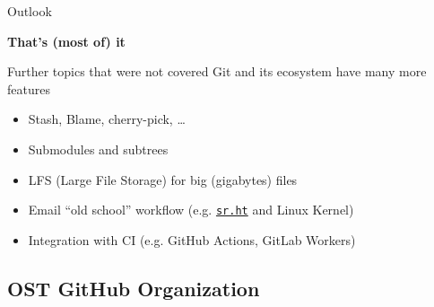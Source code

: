 \documentclass[xetex]{beamer}
\begin{document}
\begin{frame}{Outlook}

  \centering
  {
    \Huge\bfseries
    That's (most of) it
  }
  \vspace{1cm}

  \begin{block}{Further topics that were not covered}
    Git and its ecosystem have many more features
    \begin{itemize}
      \item Stash, Blame, cherry-pick, \ldots
      \item Submodules and subtrees
      \item LFS (Large File Storage) for big (gigabytes) files 
      \item Email ``old school'' workflow (e.g. \href{https://sr.ht}{\texttt{sr.ht}} and Linux Kernel)
      \item Integration with CI (e.g. GitHub Actions, GitLab Workers)
    \end{itemize}
  \end{block}
\end{frame}

\subsection{OST GitHub Organization}
\end{document}
